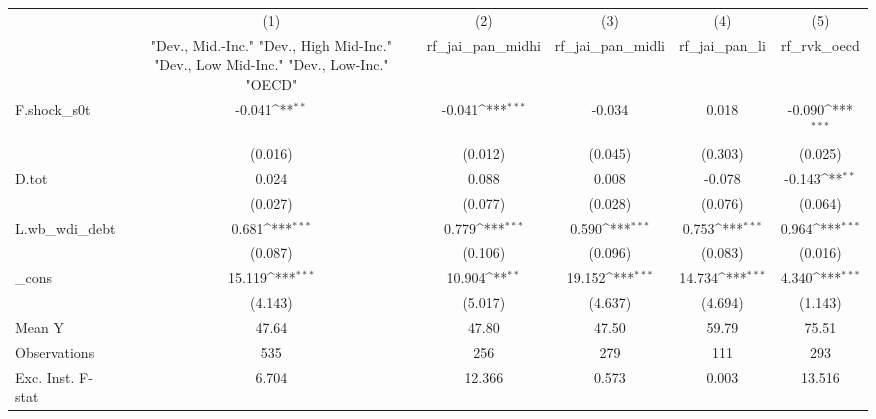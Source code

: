 {
\def\sym#1{\ifmmode^{#1}\else\(^{#1}\)\fi}
\begin{tabular}{l*{5}{c}}
\toprule
            &\multicolumn{1}{c}{(1)}&\multicolumn{1}{c}{(2)}&\multicolumn{1}{c}{(3)}&\multicolumn{1}{c}{(4)}&\multicolumn{1}{c}{(5)}\\
            &\multicolumn{1}{c}{ "Dev., Mid.-Inc." "Dev., High Mid-Inc." "Dev., Low Mid-Inc." "Dev., Low-Inc." "OECD" }&\multicolumn{1}{c}{rf\_jai\_pan\_midhi}&\multicolumn{1}{c}{rf\_jai\_pan\_midli}&\multicolumn{1}{c}{rf\_jai\_pan\_li}&\multicolumn{1}{c}{rf\_rvk\_oecd}\\
\midrule
F.shock\_s0t &      -0.041\sym{**} &      -0.041\sym{***}&      -0.034         &       0.018         &      -0.090\sym{***}\\
            &     (0.016)         &     (0.012)         &     (0.045)         &     (0.303)         &     (0.025)         \\
\addlinespace
D.tot       &       0.024         &       0.088         &       0.008         &      -0.078         &      -0.143\sym{**} \\
            &     (0.027)         &     (0.077)         &     (0.028)         &     (0.076)         &     (0.064)         \\
\addlinespace
L.wb\_wdi\_debt&       0.681\sym{***}&       0.779\sym{***}&       0.590\sym{***}&       0.753\sym{***}&       0.964\sym{***}\\
            &     (0.087)         &     (0.106)         &     (0.096)         &     (0.083)         &     (0.016)         \\
\addlinespace
\_cons      &      15.119\sym{***}&      10.904\sym{**} &      19.152\sym{***}&      14.734\sym{***}&       4.340\sym{***}\\
            &     (4.143)         &     (5.017)         &     (4.637)         &     (4.694)         &     (1.143)         \\
\midrule
Mean Y      &       47.64         &       47.80         &       47.50         &       59.79         &       75.51         \\
Observations&         535         &         256         &         279         &         111         &         293         \\
Exc. Inst. F-stat&       6.704         &      12.366         &       0.573         &       0.003         &      13.516         \\
\bottomrule
\end{tabular}
}
